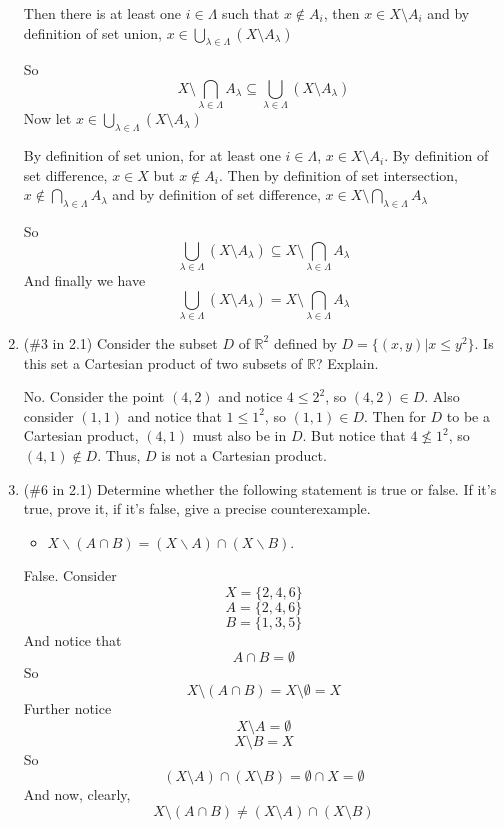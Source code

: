 \documentclass{article}
\begin{document}
\begin{enumerate}
Then there is at least one $i \in \Lambda$ such that $x \notin A_i$, then $x \in X \setminus A_i$ and by definition of set union, $x \in \bigcup_{\lambda \in \Lambda}(X \setminus A_{\lambda})$
\newline

So 
\[X \setminus \bigcap_{\lambda \in \Lambda}A_{\lambda} \subseteq \bigcup_{\lambda \in \Lambda}(X \setminus A_{\lambda})\]
Now let $x \in \bigcup_{\lambda \in \Lambda}(X \setminus A_{\lambda})$
\newline

By definition of set union, for at least one $i \in \Lambda$, $x \in X \setminus A_i$. By definition of set difference, $x \in X$ but $x \notin A_i$.\newline
Then by definition of set intersection, $x \notin \bigcap_{\lambda \in \Lambda}A_{\lambda}$ and by definition of set difference, $x \in X \setminus \bigcap_{\lambda \in \Lambda}A_{\lambda}$
\newline

So 
\[\bigcup_{\lambda \in \Lambda}(X \setminus A_{\lambda}) \subseteq X \setminus \bigcap_{\lambda \in \Lambda} A_{\lambda}\]
And finally we have 
\[\bigcup_{\lambda \in \Lambda}(X \setminus A_{\lambda}) = X \setminus \bigcap_{\lambda \in \Lambda} A_{\lambda}\]

\item{}
(\#3 in 2.1) Consider the subset $D$ of $\mathbb{R}^2$ defined by $D=\{(x,y)|x\leq y^2\}$. Is this set a Cartesian product of two subsets of $\mathbb{R}$? Explain.
\newline

No. Consider the point $(4, 2)$ and notice $4 \leq 2^2$, so $(4,2) \in D$. Also consider $(1,1)$ and notice that $1 \leq 1^2$, so $(1,1) \in D$. Then for $D$ to be a Cartesian product, $(4,1)$ must also be in $D$. But notice that $4 \nleq 1^2$, so $(4,1) \notin D$. Thus, $D$ is not a Cartesian product.

\item{}
(\#6 in 2.1) Determine whether the following statement is true or false. If it's true, prove it, if it's false, give a precise counterexample.
  \begin{itemize}
  \item $X\backslash(A\cap B)=(X\backslash A)\cap (X\backslash B)$.
  \end{itemize}
 
  
False. Consider 
\[X = \{2, 4, 6\}\]
\[A = \{2, 4, 6\}\]
\[B = \{1, 3, 5\}\]
And notice that 
\[A \cap B = \emptyset\]
So 
\[X \setminus (A \cap B) = X \setminus \emptyset = X\]
Further notice
\[X \setminus A = \emptyset\]
\[X \setminus B = X\]
So
\[(X \setminus A) \cap (X \setminus B) = \emptyset \cap X = \emptyset\]
And now, clearly,
\[X \setminus (A \cap B) \neq (X \setminus A) \cap (X \setminus B)\]



\end{enumerate}
\end{document}
